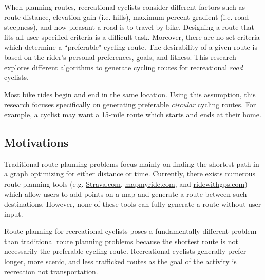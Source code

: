 \documentclass[honors]{union-cs-thesis}
\newcommand{\td}{\todo[inline]}
\begin{document}
When planning routes, recreational cyclists consider different factors such as route distance, elevation gain (i.e. hills), maximum percent gradient (i.e. road steepness), and how pleasant a road is to travel by bike. Designing a route that fits all user-specified criteria is a difficult task.  Moreover, there are no set criteria which determine a ``preferable" cycling route. The desirability of a given route is based on the rider's personal preferences, goals, and fitness. This research explores different algorithms to generate cycling routes for recreational \emph{road} cyclists.


Most bike rides begin and end in the same location. Using this assumption, this research focuses specifically on generating preferable \emph{circular} cycling routes. For example, a cyclist may want a 15-mile route which starts and ends at their home.
    

\subsection{Motivations}
Traditional route planning problems focus mainly on finding the shortest path in a graph optimizing for either distance or time. Currently, there exists numerous route planning tools (e.g. \href{https://www.strava.com/routes/new}{Strava.com}, \href{https://www.mapmyride.com}{mapmyride.com}, and \href{https://ridewithgps.com}{ridewithgps.com}) which allow users to add points on a map and generate a route between such destinations. However, none of these tools can fully generate a route without user input.

Route planning for recreational cyclists poses a fundamentally different problem than traditional route planning problems because the shortest route is not necessarily the 	preferable cycling route. Recreational cyclists generally prefer longer, more scenic, and less trafficked routes as the goal of the activity is recreation not transportation. 

\end{document}
